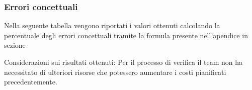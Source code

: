 \subsubsection{Errori concettuali}

Nella seguente tabella vengono riportati i valori ottenuti calcolando la percentuale degli errori concettuali tramite la formula presente nell'apendice in sezione ~


Considerazioni sui risultati ottenuti: Per il processo di verifica il team non ha necessitato di ulteriori risorse che potessero aumentare i costi pianificati precedentemente.

